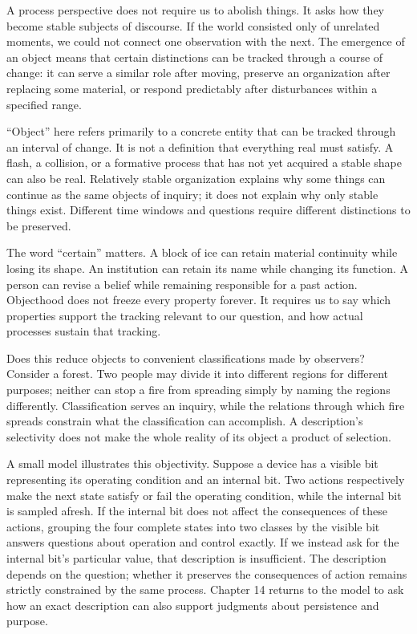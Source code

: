 \documentclass[
  english,
  11pt,
  oneside]{book}
\begin{document}
A process perspective does not require us to abolish things. It asks how they become stable subjects of discourse. If the world consisted only of unrelated moments, we could not connect one observation with the next. The emergence of an object means that certain distinctions can be tracked through a course of change: it can serve a similar role after moving, preserve an organization after replacing some material, or respond predictably after disturbances within a specified range.

``Object'' here refers primarily to a concrete entity that can be tracked through an interval of change. It is not a definition that everything real must satisfy. A flash, a collision, or a formative process that has not yet acquired a stable shape can also be real. Relatively stable organization explains why some things can continue as the same objects of inquiry; it does not explain why only stable things exist. Different time windows and questions require different distinctions to be preserved.

The word ``certain'' matters. A block of ice can retain material continuity while losing its shape. An institution can retain its name while changing its function. A person can revise a belief while remaining responsible for a past action. Objecthood does not freeze every property forever. It requires us to say which properties support the tracking relevant to our question, and how actual processes sustain that tracking.

Does this reduce objects to convenient classifications made by observers? Consider a forest. Two people may divide it into different regions for different purposes; neither can stop a fire from spreading simply by naming the regions differently. Classification serves an inquiry, while the relations through which fire spreads constrain what the classification can accomplish. A description's selectivity does not make the whole reality of its object a product of selection.

A small model illustrates this objectivity. Suppose a device has a visible bit representing its operating condition and an internal bit. Two actions respectively make the next state satisfy or fail the operating condition, while the internal bit is sampled afresh. If the internal bit does not affect the consequences of these actions, grouping the four complete states into two classes by the visible bit answers questions about operation and control exactly. If we instead ask for the internal bit's particular value, that description is insufficient. The description depends on the question; whether it preserves the consequences of action remains strictly constrained by the same process. Chapter 14 returns to the model to ask how an exact description can also support judgments about persistence and purpose.
\end{document}
